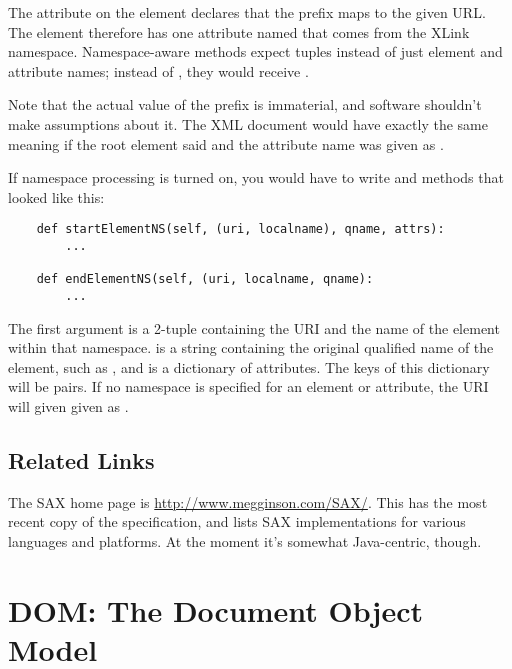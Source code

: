 \documentclass{howto}
\newcommand{\element}[1]{\code{#1}}
\newcommand{\attribute}[1]{\code{#1}}
\begin{document}
The \attribute{xmlns:xlink} attribute on the \element{root} element
declares that the prefix  maps to the given URL.  The
\element{elem} element therefore has one attribute named
\attribute{href} that comes from the XLink namespace.  Namespace-aware
methods expect  tuples instead of just
element and attribute names; instead of , they would
receive .

Note that the actual value of the prefix is immaterial, and software
shouldn't make assumptions about it.  The XML document would have
exactly the same meaning if the root element said
 and the attribute name was given as
.

If namespace processing is turned on, you would have to write
 and  methods that
looked like this:

\begin{verbatim}
    def startElementNS(self, (uri, localname), qname, attrs):
        ...

    def endElementNS(self, (uri, localname, qname):
        ...
\end{verbatim}

The first argument is a 2-tuple containing the URI and the name of the
element within that namespace.   is a string containing the
original qualified name of the element, such as , and
 is a dictionary of attributes.  The keys of this
dictionary will be  pairs.  If
no namespace is specified for an element or attribute, the URI will
given given as .


\subsection{Related Links}

The SAX home page is \url{http://www.megginson.com/SAX/}.  This has
the most recent copy of the specification, and lists SAX
implementations for various languages and platforms.  At the moment
it's somewhat Java-centric, though.


\section{DOM: The Document Object Model}
\label{section-DOM}
\end{document}
